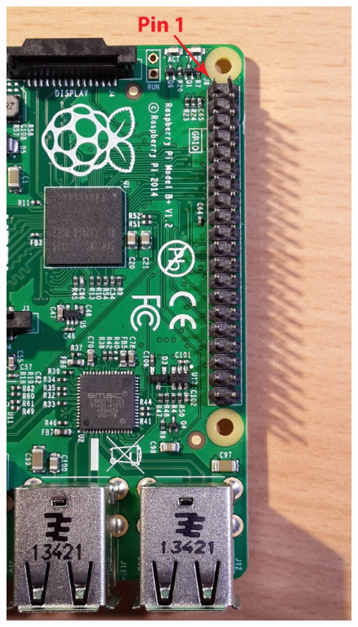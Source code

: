 \begin{figure}[H]
    \centering
    \includegraphics[height=0.4\textheight]{Schwingkreis/Bilder/B_plus_hdr_sm.jpg}

\end{figure}
